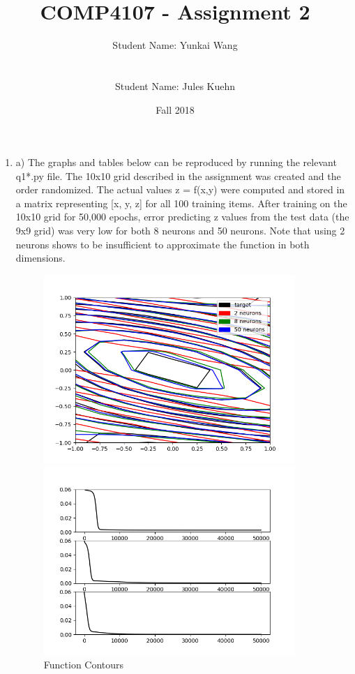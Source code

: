 \documentclass[11pt]{article}
\title{COMP4107 - Assignment 2}
\author{Student Name: Yunkai Wang\\
\text{Student Number: 100968473}\\\\
Student Name: Jules Kuehn\\
\text{Student Number: 100661464}}
\date{Fall 2018}
\begin{document}
\maketitle
\begin{enumerate}

\item
a) The graphs and tables below can be reproduced by running the relevant q1*.py file.\newline
\newline
The 10x10 grid described in the assignment was created and the order randomized. The actual values z = f(x,y) were computed and stored in a matrix representing [x, y, z] for all 100 training items. After training on the 10x10 grid for 50,000 epochs, error predicting z values from the test data (the 9x9 grid) was very low for both 8 neurons and 50 neurons. Note that using 2 neurons shows to be insufficient to approximate the function in both dimensions.\newline
\begin{figure}[h!]
    \centering
    \begin{minipage}{0.45\textwidth}
        \centering
        \includegraphics[width=0.9\textwidth]{q1a-2} %
        \caption{Function Contours}
    \end{minipage}\hfill
    \begin{minipage}{0.45\textwidth}
        \centering
        \includegraphics[width=0.9\textwidth]{q1a-2-costs} %

\end{minipage}
\end{figure}
\end{enumerate}
\end{document}
